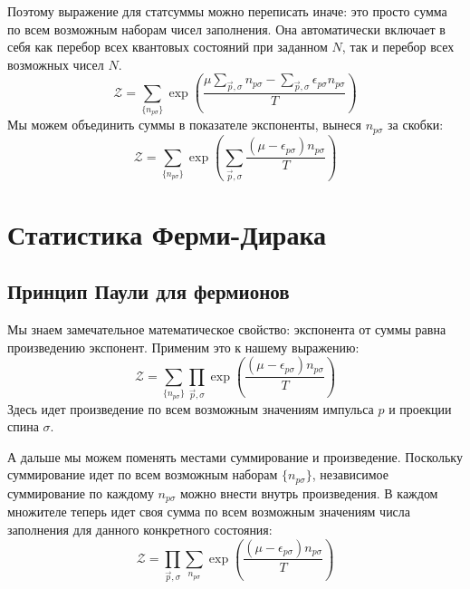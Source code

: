 \documentclass[../general/general]{subfiles}
\begin{document}
Поэтому выражение для статсуммы можно переписать иначе: это просто сумма по всем возможным наборам чисел заполнения. Она автоматически включает в себя как перебор всех квантовых состояний при заданном $N$, так и перебор всех возможных чисел $N$.
\begin{equation}
    \mathcal{Z} = \sum_{\{n_{p\sigma}\}} \exp\left( \frac{\mu \sum_{\vec{p}, \sigma} n_{p\sigma} - \sum_{\vec{p}, \sigma} \epsilon_{p\sigma} n_{p\sigma}}{T} \right)
\end{equation}
Мы можем объединить суммы в показателе экспоненты, вынеся $n_{p\sigma}$ за скобки:
\begin{equation}
    \mathcal{Z} = \sum_{\{n_{p\sigma}\}} \exp\left( \sum_{\vec{p}, \sigma} \frac{(\mu - \epsilon_{p\sigma}) n_{p\sigma}}{T} \right)
\end{equation}



\section{Статистика Ферми-Дирака}

\subsection{Принцип Паули для фермионов}

Мы знаем замечательное математическое свойство: экспонента от суммы равна произведению экспонент. Применим это к нашему выражению:
\begin{equation}
    \mathcal{Z} = \sum_{\{n_{p\sigma}\}} \prod_{\vec{p}, \sigma} \exp\left( \frac{(\mu - \epsilon_{p\sigma}) n_{p\sigma}}{T} \right)
\end{equation}
Здесь идет произведение по всем возможным значениям импульса $p$ и проекции спина $\sigma$. 

А дальше мы можем поменять местами суммирование и произведение. Поскольку суммирование идет по всем возможным наборам $\{n_{p\sigma}\}$, независимое суммирование по каждому $n_{p\sigma}$ можно внести внутрь произведения. В каждом множителе теперь идет своя сумма по всем возможным значениям числа заполнения для данного конкретного состояния:
\begin{equation}
    \mathcal{Z} = \prod_{\vec{p}, \sigma} \sum_{n_{p\sigma}} \exp\left( \frac{(\mu - \epsilon_{p\sigma}) n_{p\sigma}}{T} \right)
\end{equation}
\end{document}
